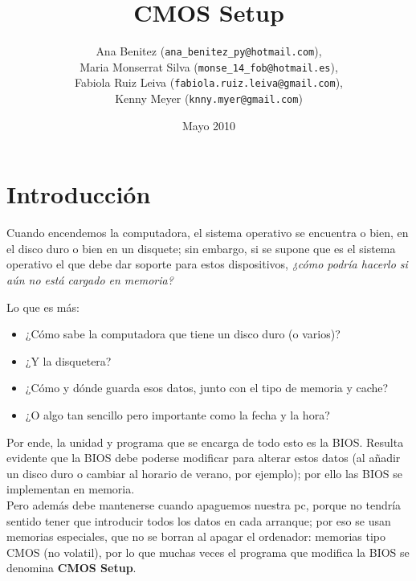 \documentclass[12pt,oneside,a4paper]{article}
\begin{document}
\title{CMOS Setup}
\author{Ana Benitez (\texttt{ana\_benitez\_py@hotmail.com}), \\
		Maria Monserrat Silva (\texttt{monse\_14\_fob@hotmail.es}), \\
		Fabiola Ruiz Leiva (\texttt{fabiola.ruiz.leiva@gmail.com}), \\ 
		Kenny Meyer (\texttt{knny.myer@gmail.com})}
\date{Mayo 2010}
\maketitle
\clearpage

%
\setcounter{tocdepth}{3}
\tableofcontents

\newpage

\section{Introducción}{\label{sec:introduccion}}

Cuando encendemos la computadora, el sistema operativo se encuentra o bien, en
el disco duro o bien en un disquete; sin embargo, si se supone que es el
sistema operativo el que debe dar soporte para estos dispositivos, {\em ¿cómo podría
hacerlo si aún no está cargado en memoria?}

Lo que es más:
\begin{itemize}
	\item ¿Cómo sabe la computadora que tiene un disco duro (o varios)?
	\item ¿Y la disquetera?  
	\item ¿Cómo y dónde guarda esos datos, junto con el tipo de memoria y cache?
	\item ¿O algo tan sencillo pero importante como la fecha y la hora? 
\end{itemize}

Por ende, la unidad y programa que se encarga de todo esto es la BIOS.
Resulta evidente que la BIOS debe poderse modificar para alterar estos datos
(al añadir un disco duro o cambiar al horario de verano, por ejemplo); por ello
las BIOS se implementan en memoria. \\
Pero además debe mantenerse cuando apaguemos nuestra pc, porque no tendría
sentido tener que introducir todos los datos en cada arranque; por eso se usan
memorias especiales, que no se borran al apagar el ordenador: memorias tipo
CMOS (no volatil), por lo que muchas veces el programa que modifica la BIOS se
denomina {\bf CMOS Setup}.
\end{document}

